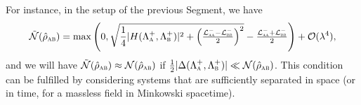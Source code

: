 \documentclass[letterpaper,12pt,titlepage,oneside,final]{book}
\renewcommand{\r}{\hat{\rho}}
\newcommand{\tc}[1]{\textsc{#1}}
\begin{document}
    For instance, in the setup of the previous Segment, we have
    \begin{equation}
        \tilde{\mathcal{N}}(\hat{\rho}_\tc{ab}) = \max\left(0,\sqrt{\frac{1}{4}|H(\Lambda_{\tc{a}}^+,\Lambda_{\tc{b}}^+)|^2 + \left(\tfrac{\mathcal{L}^-_\tc{aa} - \mathcal{L}^-_\tc{bb}}{2}\right)^2} - \tfrac{\mathcal{L}^-_{\tc{aa}} + \mathcal{L}^-_\tc{bb}}{2}\right) + \mathcal{O}(\lambda^4),
    \end{equation}
    and we will have $\tilde{\mathcal{N}}(\hat{\rho}_\tc{ab}) \approx {\mathcal{N}}(\hat{\rho}_\tc{ab})$ if $\tfrac{1}{2}|\Delta(\Lambda^+_\tc{a},\Lambda^+_\tc{b})| \ll \mathcal{N}(\r_\tc{ab})$. This condition can be fulfilled by considering systems that are sufficiently separated in space (or in time, for a massless field in Minkowski spacetime).
    
    
    

    
    
\end{document}
